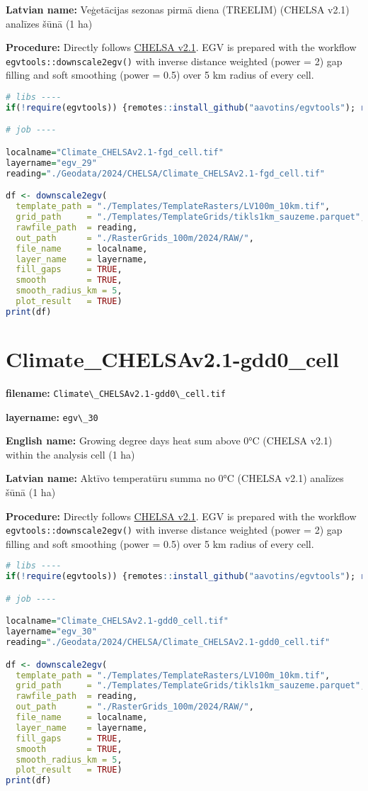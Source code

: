 \documentclass[
]{book}
\newcommand{\passthrough}[1]{#1}
\begin{document}
\textbf{Latvian name:} Veģetācijas sezonas pirmā diena (TREELIM) (CHELSA v2.1) analīzes šūnā (1 ha)

\textbf{Procedure:} Directly follows \hyperref[Ch04.11]{CHELSA v2.1}. EGV is prepared with the
workflow \passthrough{\lstinline!egvtools::downscale2egv()!} with inverse distance weighted (power = 2)
gap filling and soft smoothing (power = 0.5) over 5 km radius of every cell.

\begin{lstlisting}[language=R]
# libs ----
if(!require(egvtools)) {remotes::install_github("aavotins/egvtools"); require(egvtools)}

# job ----

localname="Climate_CHELSAv2.1-fgd_cell.tif"
layername="egv_29"
reading="./Geodata/2024/CHELSA/Climate_CHELSAv2.1-fgd_cell.tif"

df <- downscale2egv(
  template_path = "./Templates/TemplateRasters/LV100m_10km.tif",
  grid_path     = "./Templates/TemplateGrids/tikls1km_sauzeme.parquet",
  rawfile_path  = reading,
  out_path      = "./RasterGrids_100m/2024/RAW/",
  file_name     = localname,
  layer_name    = layername,
  fill_gaps     = TRUE,
  smooth        = TRUE,
  smooth_radius_km = 5,
  plot_result   = TRUE)
print(df)
\end{lstlisting}

\section{Climate\_CHELSAv2.1-gdd0\_cell}\label{ch06.030}

\textbf{filename:} \passthrough{\lstinline!Climate\_CHELSAv2.1-gdd0\_cell.tif!}

\textbf{layername:} \passthrough{\lstinline!egv\_30!}

\textbf{English name:} Growing degree days heat sum above 0°C (CHELSA v2.1) within the analysis cell (1 ha)

\textbf{Latvian name:} Aktīvo temperatūru summa no 0°C (CHELSA v2.1) analīzes šūnā (1 ha)

\textbf{Procedure:} Directly follows \hyperref[Ch04.11]{CHELSA v2.1}. EGV is prepared with the
workflow \passthrough{\lstinline!egvtools::downscale2egv()!} with inverse distance weighted (power = 2)
gap filling and soft smoothing (power = 0.5) over 5 km radius of every cell.

\begin{lstlisting}[language=R]
# libs ----
if(!require(egvtools)) {remotes::install_github("aavotins/egvtools"); require(egvtools)}

# job ----

localname="Climate_CHELSAv2.1-gdd0_cell.tif"
layername="egv_30"
reading="./Geodata/2024/CHELSA/Climate_CHELSAv2.1-gdd0_cell.tif"

df <- downscale2egv(
  template_path = "./Templates/TemplateRasters/LV100m_10km.tif",
  grid_path     = "./Templates/TemplateGrids/tikls1km_sauzeme.parquet",
  rawfile_path  = reading,
  out_path      = "./RasterGrids_100m/2024/RAW/",
  file_name     = localname,
  layer_name    = layername,
  fill_gaps     = TRUE,
  smooth        = TRUE,
  smooth_radius_km = 5,
  plot_result   = TRUE)
print(df)
\end{lstlisting}
\end{document}
